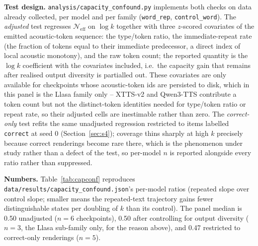 \documentclass[11pt]{article}
\begin{document}
\textbf{Test design.} \texttt{analysis/capacity\_confound.py} implements both
checks on data already collected, per model and per family
(\texttt{word\_rep}, \texttt{control\_word}). The \emph{adjusted} test
regresses $\mathcal{N}_{\mathrm{eff}}$ on $\log k$ together with three
$z$-scored covariates of the emitted acoustic-token sequence: the type/token
ratio, the immediate-repeat rate (the fraction of tokens equal to their
immediate predecessor, a direct index of local acoustic monotony), and the raw
token count; the reported quantity is the $\log k$ coefficient with the
covariates included, i.e.\ the capacity gain that remains after realised
output diversity is partialled out. These covariates are only available for
checkpoints whose acoustic-token ids are persisted to disk, which in this
panel is the Llasa family only -- XTTS-v2 and Qwen3-TTS contribute a token
count but not the distinct-token identities needed for type/token ratio or
repeat rate, so their adjusted cells are inestimable rather than zero. The
\emph{correct-only} test refits the same unadjusted regression restricted to
items labelled \texttt{correct} at seed $0$ (Section~\ref{sec:s4}); coverage
thins sharply at high $k$ precisely because correct renderings become rare
there, which is the phenomenon under study rather than a defect of the test,
so per-model $n$ is reported alongside every ratio rather than suppressed.

\textbf{Numbers.} Table~\ref{tab:capconf} reproduces
\texttt{data/results/capacity\_confound.json}'s per-model ratios (repeated
slope over control slope; smaller means the repeated-text trajectory gains
fewer distinguishable states per doubling of $k$ than its control). The panel
median is 0.50 unadjusted ($n{=}6$ checkpoints), 0.50
after controlling for output diversity ($n{=}3$, the Llasa sub-family only,
for the reason above), and 0.47 restricted to correct-only
renderings ($n{=}5$).
\end{document}
